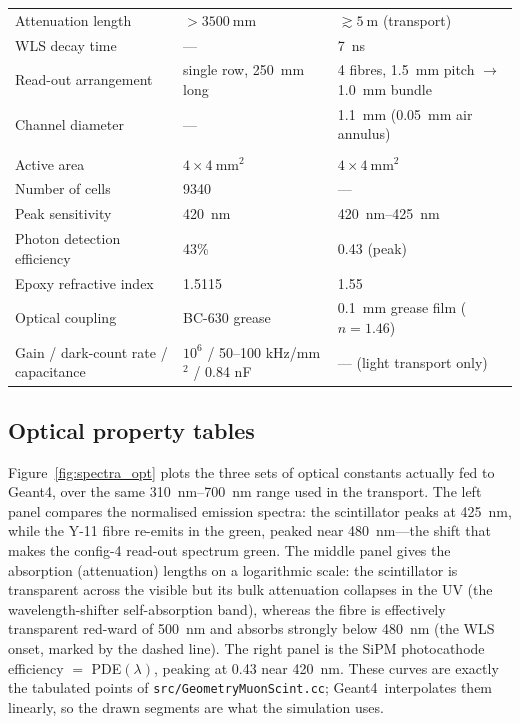 \documentclass[11pt,a4paper]{article}
\newcommand{\gfour}{Geant4}
\begin{document}
\begin{table}[H]
\begin{tabularx}{\textwidth}{@{}>{\raggedright\arraybackslash}p{} L L@{}}
Attenuation length & $>\SI{3500}{\milli\meter}$ & $\gtrsim\SI{5}{\meter}$ (transport) \\
WLS decay time & --- & \SI{7}{\nano\second} \\
Read-out arrangement & single row, \SI{250}{\milli\meter} long & 4 fibres, \SI{1.5}{\milli\meter} pitch $\to$ \SI{1.0}{\milli\meter} bundle \\
Channel diameter & --- & \SI{1.1}{\milli\meter} (\SI{0.05}{\milli\meter} air annulus) \\
\midrule
{}\\
Active area & $4 \times \SI{4}{\milli\meter\squared}$ & $4 \times \SI{4}{\milli\meter\squared}$ \\
Number of cells & 9340 & --- \\
Peak sensitivity & \SI{420}{\nano\meter} & \SIrange{420}{425}{\nano\meter} \\
Photon detection efficiency & 43\% & 0.43 (peak) \\
Epoxy refractive index & 1.5115 & 1.55 \\
Optical coupling & BC-630 grease & \SI{0.1}{\milli\meter} grease film ($n=1.46$) \\
Gain / dark-count rate / capacitance & $10^6$ / 50--100 kHz/mm$^2$ / 0.84 nF & --- (light transport only) \\
\bottomrule
\end{tabularx}
\end{table}

\subsection{Optical property tables}
\label{sec:optprops}

Figure~\ref{fig:spectra_opt} plots the three sets of optical constants actually
fed to \gfour, over the same \SIrange{310}{700}{\nano\meter} range used in the
transport. The left panel compares the normalised emission spectra: the
scintillator peaks at \SI{425}{\nano\meter}, while the Y-11 fibre re-emits in
the green, peaked near \SI{480}{\nano\meter}---the shift that makes the config-4
read-out spectrum green. The middle panel gives the absorption (attenuation)
lengths on a logarithmic scale: the scintillator is transparent across the
visible but its bulk attenuation collapses in the UV (the wavelength-shifter
self-absorption band), whereas the fibre is effectively transparent red-ward of
\SI{500}{\nano\meter} and absorbs strongly below \SI{480}{\nano\meter} (the WLS
onset, marked by the dashed line). The right panel is the SiPM photocathode
efficiency $=$ PDE$(\lambda)$, peaking at \num{0.43} near \SI{420}{\nano\meter}.
These curves are exactly the tabulated points of
\texttt{src/GeometryMuonScint.cc}; \gfour\ interpolates them linearly, so the
drawn segments are what the simulation uses.
\end{document}
